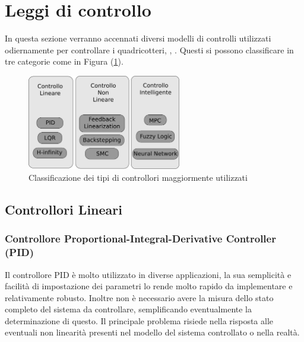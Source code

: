 \section{Leggi di controllo}
In questa sezione verranno accennati diversi modelli di controlli utilizzati odiernamente per controllare i quadricotteri, \cite{ZuluAndrew2014ARoC}, \cite{KimJinho2020ACSo}. Questi si possono classificare in tre categorie come in Figura (\ref{fig:categoriecontrolli}).
\begin{figure}
	\centering
	\includegraphics[width=0.6\textwidth]{SistemaQuadrirotore/Figure/Classificazione}
	\caption{Classificazione dei tipi di controllori maggiormente utilizzati \cite{KimJinho2020ACSo}}
	\label{fig:categoriecontrolli}
\end{figure}


\subsection{Controllori Lineari}
\subsubsection{Controllore Proportional-Integral-Derivative Controller (PID)}
Il controllore PID è molto utilizzato in diverse applicazioni, la sua semplicità e facilità di impostazione dei parametri lo rende molto rapido da implementare e relativamente robusto. Inoltre non è necessario avere la misura dello stato completo del sistema da controllare, semplificando eventualmente la determinazione di questo. Il principale problema risiede nella risposta alle eventuali non linearità presenti nel modello del sistema controllato o nella realtà.

